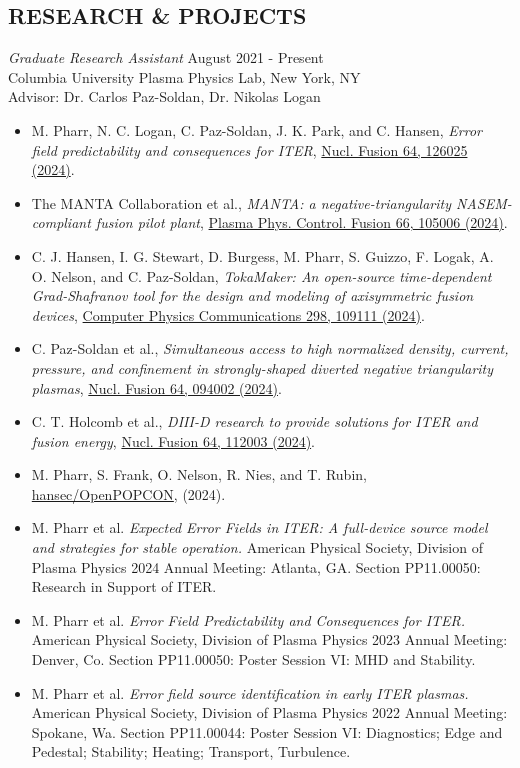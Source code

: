 \documentclass[margin]{rpires}
\begin{document}
\begin{resume}
\section{RESEARCH \& PROJECTS}
    \textit{Graduate Research Assistant} \hfill August 2021 - Present \\
    Columbia University Plasma Physics Lab, 
    New York, NY\\ 
    Advisor: Dr. Carlos Paz-Soldan, Dr. Nikolas Logan
    \begin{itemize}  \itemsep -2pt %
    \item {M. Pharr, N. C. Logan, C. Paz-Soldan, J. K. Park, and C. Hansen, \textit{Error field predictability and consequences for ITER}, \href{https://dx.doi.org/10.1088/1741-4326/ad7ed6}{Nucl. Fusion 64, 126025 (2024)}.}
    \item {The MANTA Collaboration et al., \textit{MANTA: a negative-triangularity NASEM-compliant fusion pilot plant}, \href{https://iopscience.iop.org/article/10.1088/1361-6587/ad6708}{Plasma Phys. Control. Fusion 66, 105006 (2024)}.}
    \item {C. J. Hansen, I. G. Stewart, D. Burgess, M. Pharr, S. Guizzo, F. Logak, A. O. Nelson, and C. Paz-Soldan, \textit{TokaMaker: An open-source time-dependent Grad-Shafranov tool for the design and modeling of axisymmetric fusion devices}, \href{https://www.sciencedirect.com/science/article/pii/S0010465524000341}{Computer Physics Communications 298, 109111 (2024)}.}
    \item {C. Paz-Soldan et al., \textit{Simultaneous access to high normalized density, current, pressure, and confinement in strongly-shaped diverted negative triangularity plasmas}, \href{https://new.iopscience.iop.org/article/10.1088/1741-4326/ad69a4/meta}{Nucl. Fusion 64, 094002 (2024)}.}
    \item {C. T. Holcomb et al., \textit{DIII-D research to provide solutions for ITER and fusion energy}, \href{https://dx.doi.org/10.1088/1741-4326/ad2fe9}{Nucl. Fusion 64, 112003 (2024)}.}
    \item {M. Pharr, S. Frank, O. Nelson, R. Nies, and T. Rubin, \href{https://github.com/hansec/OpenPOPCON}{hansec/OpenPOPCON}, (2024). }
    \vspace{0.5cm}
    \item M. Pharr et al. \textit{Expected Error Fields in ITER: A full-device source model and strategies for stable operation.} American Physical Society, Division of Plasma Physics 2024 Annual Meeting: Atlanta, GA. Section PP11.00050: Research in Support of ITER.
    \item M. Pharr et al. \textit{Error Field Predictability and Consequences for ITER.} American Physical Society, Division of Plasma Physics 2023 Annual Meeting: Denver, Co. Section PP11.00050: Poster Session VI: MHD and Stability.
    \item M. Pharr et al. \textit{Error field source identification in early ITER plasmas.} American Physical Society, Division of Plasma Physics 2022 Annual Meeting: Spokane, Wa. Section PP11.00044: Poster Session VI: Diagnostics; Edge and Pedestal; Stability; Heating; Transport, Turbulence.
    \end{itemize}


\end{resume}
\end{document}
